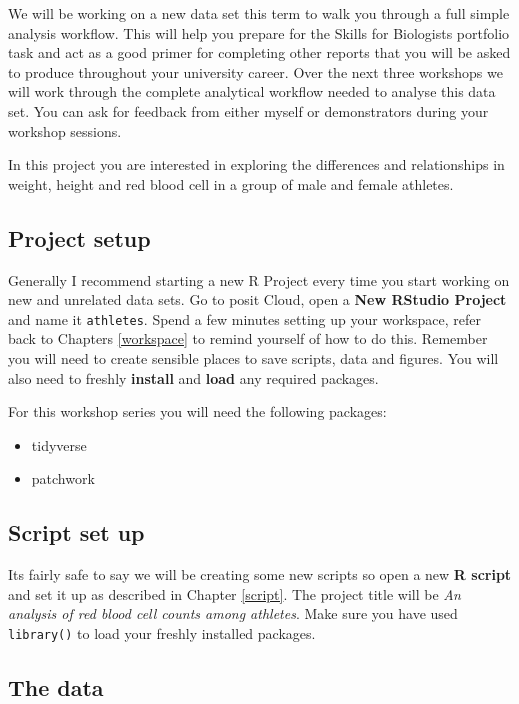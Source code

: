 \documentclass[
]{book}
\providecommand{\tightlist}{%
  \setlength{\itemsep}{0pt}\setlength{\parskip}{0pt}}
\begin{document}
We will be working on a new data set this term to walk you through a full simple analysis workflow. This will help you prepare for the Skills for Biologists portfolio task and act as a good primer for completing other reports that you will be asked to produce throughout your university career. Over the next three workshops we will work through the complete analytical workflow needed to analyse this data set. You can ask for feedback from either myself or demonstrators during your workshop sessions.

In this project you are interested in exploring the differences and relationships in weight, height and red blood cell in a group of male and female athletes.

\hypertarget{project-setup}{%
\subsection{Project setup}\label{project-setup}}

Generally I recommend starting a new R Project every time you start working on new and unrelated data sets. Go to posit Cloud, open a \textbf{New RStudio Project} and name it \texttt{athletes}. Spend a few minutes setting up your workspace, refer back to Chapters \ref{workspace} to remind yourself of how to do this. Remember you will need to create sensible places to save scripts, data and figures. You will also need to freshly \textbf{install} and \textbf{load} any required packages.

For this workshop series you will need the following packages:

\begin{itemize}
\tightlist
\item
  tidyverse
\item
  patchwork
\end{itemize}

\hypertarget{script-set-up}{%
\subsection{Script set up}\label{script-set-up}}

Its fairly safe to say we will be creating some new scripts so open a new \textbf{R script} and set it up as described in Chapter \ref{script}. The project title will be \emph{An analysis of red blood cell counts among athletes}. Make sure you have used \texttt{library()} to load your freshly installed packages.

\hypertarget{the-data}{%
\subsection{The data}\label{the-data}}
\end{document}

